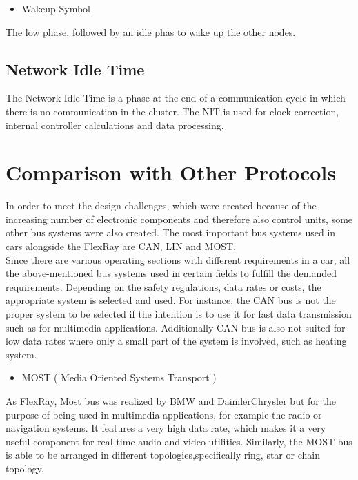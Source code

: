 \documentclass[conference]{IEEEtran}
\begin{document}
\begin{itemize}
  \item Wakeup Symbol
\end{itemize}
The low phase, followed by an idle phas to wake up the other nodes.

\subsection{Network Idle Time}
The Network Idle Time is a phase at the end of a communication cycle in which there is no communication in the cluster. The NIT is used for clock correction, internal controller calculations and data processing.

\section{Comparison with Other Protocols}

In order to meet the design challenges, which were created because of the increasing number of electronic components and therefore also control units, some other bus systems were also created. The most important bus systems used in cars alongside the FlexRay are CAN, LIN and MOST.\\

Since there are various operating sections with different requirements in a car, all the above-mentioned  bus systems used in certain fields to fulfill the demanded requirements. Depending on the safety regulations, data rates or costs, the appropriate system is selected and used. For instance, the CAN bus is not the proper system to be selected if the intention is to use it for fast data transmission such as for multimedia applications. Additionally CAN bus is also not suited for low data rates where only a small part of the system is involved, such as heating system.\\

\begin{itemize}
  \item MOST ( Media Oriented Systems Transport )
\end{itemize}
As FlexRay, Most bus was realized by BMW and DaimlerChrysler but for the purpose of being used in multimedia applications, for example the radio or navigation systems. It features a very high data rate, which makes it a very useful component for real-time audio and video utilities. Similarly, the MOST bus is able to be arranged in different topologies,specifically ring, star or chain topology.\\
\end{document}
